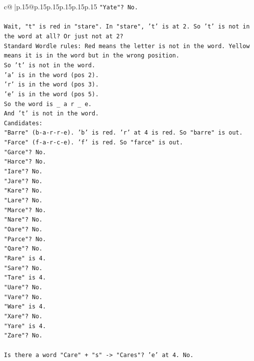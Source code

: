 \documentclass{article}
\begin{document}
{\begin{supertabular}{c@{$\;$}|p{.15\linewidth}@{}p{.15\linewidth}p{.15\linewidth}p{.15\linewidth}p{.15\linewidth}p{.15\linewidth}}
{{{\texttt{"Yate"? No.} \\
\\ 
\texttt{Wait, "t" is red in "stare". In "stare", 't' is at 2. So 't' is not in the word at all? Or just not at 2?} \\
\texttt{Standard Wordle rules: Red means the letter is not in the word. Yellow means it is in the word but in the wrong position.} \\
\texttt{So 't' is not in the word.} \\
\texttt{'a' is in the word (pos 2).} \\
\texttt{'r' is in the word (pos 3).} \\
\texttt{'e' is in the word (pos 5).} \\
\texttt{So the word is \_ a r \_ e.} \\
\texttt{And 't' is not in the word.} \\
\texttt{Candidates:} \\
\texttt{"Barre" (b{-}a{-}r{-}r{-}e). 'b' is red. 'r' at 4 is red. So "barre" is out.} \\
\texttt{"Farce" (f{-}a{-}r{-}c{-}e). 'f' is red. So "farce" is out.} \\
\texttt{"Garce"? No.} \\
\texttt{"Harce"? No.} \\
\texttt{"Iare"? No.} \\
\texttt{"Jare"? No.} \\
\texttt{"Kare"? No.} \\
\texttt{"Lare"? No.} \\
\texttt{"Marce"? No.} \\
\texttt{"Nare"? No.} \\
\texttt{"Oare"? No.} \\
\texttt{"Parce"? No.} \\
\texttt{"Qare"? No.} \\
\texttt{"Rare" is 4.} \\
\texttt{"Sare"? No.} \\
\texttt{"Tare" is 4.} \\
\texttt{"Uare"? No.} \\
\texttt{"Vare"? No.} \\
\texttt{"Ware" is 4.} \\
\texttt{"Xare"? No.} \\
\texttt{"Yare" is 4.} \\
\texttt{"Zare"? No.} \\
\\ 
\texttt{Is there a word "Care" + "s" {-}> "Cares"? 'e' at 4. No.} \\
}}}
\end{supertabular}}
\end{document}
